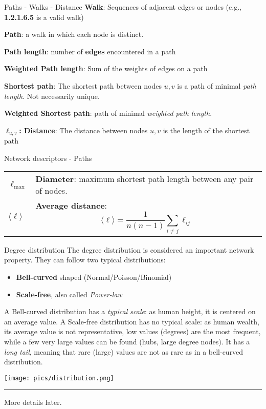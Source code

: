 \begin{textbox}{Paths - Walks - Distance}
    \textbf{Walk}: Sequences of adjacent edges or nodes (e.g., \textbf{1.2.1.6.5} is a valid walk)

    \textbf{Path}: a walk in which each node is distinct.

    \textbf{Path length}: number of \textbf{edges} encountered in a path

    \textbf{Weighted Path length}: Sum of the weights of edges on a path

    \textbf{Shortest path}: The shortest path between nodes $u,v$ is a path of minimal \textit{path length}. Not necessarily unique.

    \textbf{Weighted Shortest path}: path of minimal \textit{weighted path length}.

    \textbf{$\ell_{u,v}$: Distance}: The distance between nodes $u,v$ is the length of the shortest path
\end{textbox}


\begin{textbox}{Network descriptors - Paths}
    \begin{tabular}{p{}|p{}}\scriptsize
        $\ell_{\max}$          & \textbf{Diameter}: maximum shortest path length between any pair of nodes. \\
        $\langle \ell \rangle$ & \textbf{Average distance}:
        \[
            \langle \ell \rangle = \frac{1}{n(n-1)}\sum_{i\neq j} \ell_{ij}
        \]                                                                                               \\
    \end{tabular}
\end{textbox}


\begin{textbox}{Degree distribution}
    The degree distribution is considered an important network property. They can follow two typical distributions:
    \begin{itemize}
        \item \textbf{Bell-curved} shaped (Normal/Poisson/Binomial)
        \item \textbf{Scale-free}, also called \textit{Power-law}
    \end{itemize}
    A Bell-curved distribution has a \textit{typical scale}: as human height, it is centered on an average value. A Scale-free distribution has no typical scale: as human wealth, its average value is not representative, low values (degrees) are the most frequent, while a few very large values can be found (hubs, large degree nodes). It has a \textit{long tail}, meaning that rare (large) values are not as rare as in a bell-curved distribution.

    \centering
    \texttt{[image: pics/distribution.png]}

    \noindent\rule{4cm}{0.1pt}

    \tiny{
        More details later.}
\end{textbox}


